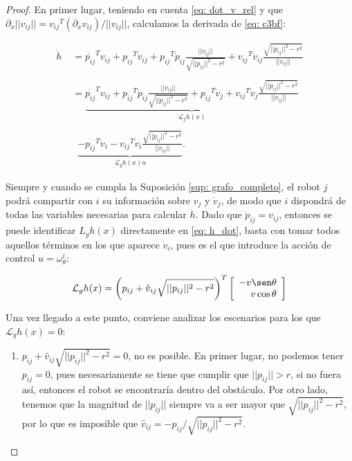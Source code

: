 \begin{proof}

En primer lugar, teniendo en cuenta \eqref{eq: dot_v_rel} y que $\partial_x ||v_{ij}|| = {v_{ij}}^T (\partial_x v_{ij}) / ||v_{ij}||$, calculamos la derivada de \eqref{eq: c3bf}:

\begin{equation} \label{eq: h_dot}
    \begin{array}{rl}
         \dot h \; & = 
         \dot {p_{ij}}^T v_{ij} + {p_{ij}}^T \dot v_{ij} + 
         {p_{ij}}^T \dot p_{ij} \frac{||v_{ij}||}{\sqrt{||p_{ij}||^2 - r^2}} + 
         {v_{ij}}^T \dot v_{ij} \frac{\sqrt{||p_{ij}||^2 - r^2}}{||v_{ij}||} \\ \\
         & = \underbrace{\dot {p_{ij}}^T v_{ij} + {p_{ij}}^T \dot p_{ij} \frac{||v_{ij}||}{\sqrt{||p_{ij}||^2 - r^2}} + 
         {p_{ij}}^T \dot v_j + {v_{ij}}^T \dot v_{j} \frac{\sqrt{||p_{ij}||^2 - r^2}}{||v_{ij}||}}
         _{\mathcal{L}_f h(x)} \\ \\
         & \;\; \underbrace{- {p_{ij}}^T \dot v_i - {v_{ij}}^T \dot v_{i} \frac{\sqrt{||p_{ij}||^2 - r^2}}{||v_{ij}||}}
         _{\mathcal{L}_g h(x) u}.
    \end{array}
\end{equation}

Siempre y cuando se cumpla la Suposición \ref{sup: grafo_completo}, el robot $j$ podrá compartir con $i$ su información sobre $v_j$ y $\dot v_j$, de modo que $i$ dispondrá de todas las variables necesarias para calcular $\dot h$. Dado que $\dot p_{ij} = v_{ij}$, entonces se puede identificar $L_g h(x)$ directamente en \eqref{eq: h_dot}, basta con tomar todos aquellos términos en los que aparece $\dot v_{i}$, pues es el que introduce la acción de control $u = \omega_{\theta}^i$:

\begin{equation}
    \mathcal{L}_g h(x) = \left( p_{ij} + \hat v_{ij} \sqrt{||p_{ij}||^2 - r^2} \right)^T 
        \left [
    \begin{array}{r}
        - v\sen\theta \\
          v\cos\theta
    \end{array}
    \right ]
\end{equation}

\newpage

Una vez llegado a este punto, conviene analizar los escenarios para los que $\mathcal{L}_g h(x) = 0$:
\begin{enumerate}
    \item $p_{ij} + \hat v_{ij} \sqrt{||p_{ij}||^2 - r^2} = 0$, no es posible. En primer lugar, no podemos tener $p_{ij} = 0$, pues necesariamente se tiene que cumplir que $||p_{ij}||>r$, si no fuera así, entonces el robot se encontraría dentro del obstáculo. Por otro lado, tenemos que la magnitud de $||p_{ij}||$ siempre va a ser mayor que $\sqrt{||p_{ij}||^2 - r^2}$, por lo que es imposible que $\hat v_{ij} = - p_{ij}/\sqrt{||p_{ij}||^2 - r^2}$.\\
    

\end{enumerate}
\end{proof}
